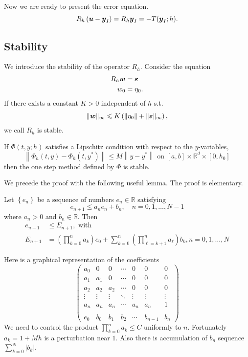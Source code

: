 \documentclass[10pt]{amsart}
\begin{document}
Now we are ready to present the error equation.
\begin{equation}\label{eq:error}
R_h\left(\boldsymbol u - \boldsymbol y_I\right)=R_h \boldsymbol y_I = - T(\boldsymbol y_I ; h).
\end{equation}

\subsection{Stability}
We introduce the stability of the operator $R_h$. Consider the equation
$$
\begin{aligned}
R_h \boldsymbol w &=\boldsymbol \varepsilon 
\\ w_0&=\eta_0.
\end{aligned}
$$
If there exists a constant $K>0$ independent of $h$ s.t. 
$$
\|\boldsymbol w\|_{\infty} \leqslant K\left(\left\|\eta_0\right\|+\|\boldsymbol \varepsilon\|_{\infty}\right),
$$
we call $R_h$ is stable. 

\begin{theorem}
If ${\Phi}(t, y ; h)$ satisfies a Lipschitz condition with respect to the $y$-variables,
$$
\left\|{\Phi}_h(t, y)-{\Phi}_h\left(t, y^*\right)\right\| \leq M\left\|y-y^*\right\| \text { on }[a, b] \times \mathbb{R}^d \times\left[0, h_0\right]
$$
then the one step method defined by $\Phi$ is stable.
\end{theorem}

We precede the proof with the following useful lemma. The proof is elementary.
\begin{lemma}\label{lm:cumsum}
Let $\left\{e_n\right\}$ be a sequence of numbers $e_n \in \mathbb{R}$ satisfying
$$
e_{n+1} \leq a_n e_n+b_n, \quad n=0,1, \ldots, N-1
$$
where $a_n>0$ and $b_n \in \mathbb{R}$. Then
$$
\begin{aligned}
e_{n+1} &\leq E_{n+1}, \text{ with }\\
E_{n+1}&=\left(\prod_{k=0}^{n} a_k\right) e_0+\sum_{k=0}^{n}\left(\prod_{\ell=k+1}^{n} a_{\ell}\right) b_k, n=0,1, \ldots, N
\end{aligned}
$$
\end{lemma}
Here is a graphical representation of the coefficients
$$
\begin{pmatrix}
a_0 & 0 & 0 & \cdots & 0 & 0 & 0\\
a_1 & a_1 & 0 & \cdots & 0 & 0 & 0\\
a_2 & a_2 & a_2 & \cdots & 0 & 0 & 0\\
\vdots & \vdots & \vdots & \ddots & \vdots & \vdots & \vdots \\
a_n & a_n & a_n & \cdots & a_n & a_n & 1 \\
\\
e_0 & b_0 & b_1 & b_2 & \cdots & b_{n-1} & b_n
\end{pmatrix}
$$
We need to control the product $\prod_{k=0}^{n} a_k \leq C$ uniformly to $n$. Fortunately $a_k  = 1 + Mh$ is a perturbation near $1$. Also there is accumulation of $b_n$ sequence $\sum_{k=0}^N |b_k|$. 
\end{document}

